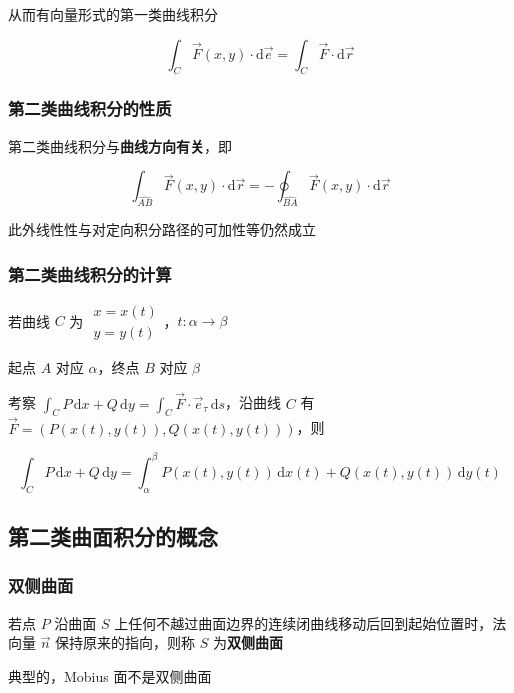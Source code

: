 \documentclass[lang = zh , final , oneside , openany , titlepage , zihao = -4 , linespread = 1.3 , baselineskip = false , cjk-font = windows , text-font = newtx , math-font = newtx , math-style = ISO , uppercase-greek = upright , integral-limits = false]{sjtureport}
\begin{document}
从而有向量形式的第一类曲线积分

\[\int_C \vec{F}(x,y) \cdot \mathrm{d}\vec{e} = \int_C \vec{F}\cdot \mathrm{d}\vec{r}\]

\subsubsection{第二类曲线积分的性质}

第二类曲线积分与\textbf{曲线方向有关}，即

\[\int_{\widehat{AB}} \vec{F}(x,y) \cdot \mathrm{d}\vec{r} = -\oint_{\widehat{BA}} \vec{F}(x,y) \cdot \mathrm{d}\vec{r}\]

此外线性性与对定向积分路径的可加性等仍然成立

\subsubsection{第二类曲线积分的计算}

若曲线 \(C\) 为
\(\begin{aligned}x=x(t)\\y=y(t)\end{aligned}\)，\(t:\alpha\rightarrow \beta\)

起点 \(A\) 对应 \(\alpha\)，终点 \(B\) 对应 \(\beta\)

考察
\(\displaystyle\int_C P\,\mathrm{d}x + Q\,\mathrm{d}y = \int_C \vec{F}\cdot\vec{e}_\tau \,\mathrm{d}s\)，沿曲线
\(C\) 有
\(\vec{F} = \left(P\left(x(t),y(t)\right),Q\left(x(t),y(t)\right)\right)\)，则

\[\int_C P\,\mathrm{d}x + Q\,\mathrm{d}y = \int_\alpha^\beta P\left(x(t),y(t)\right)\,\mathrm{d}x(t) + Q\left(x(t),y(t)\right)\,\mathrm{d}y(t)\]

\subsection{第二类曲面积分的概念}

\subsubsection{双侧曲面}

\begin{definition}
    若点 \(P\) 沿曲面 \(S\)
上任何不越过曲面边界的连续闭曲线移动后回到起始位置时，法向量 \(\vec{n}\)
保持原来的指向，则称 \(S\) 为\textbf{双侧曲面}
\end{definition}

典型的，Mobius 面不是双侧曲面
\end{document}
